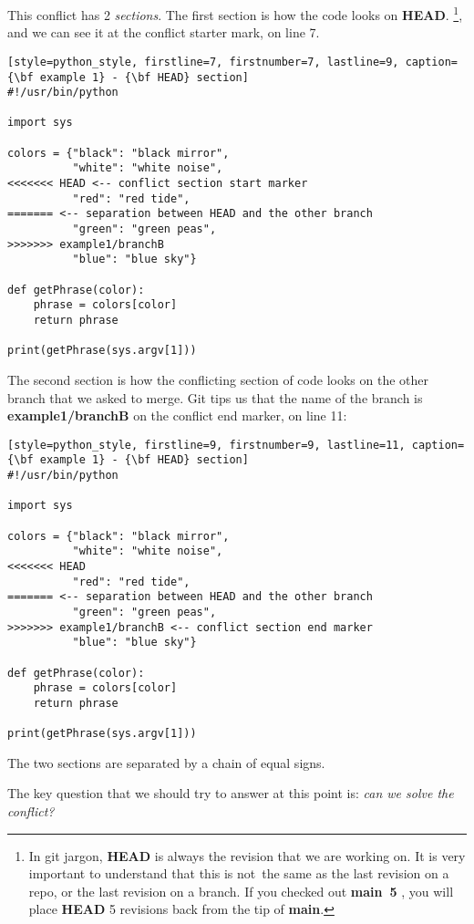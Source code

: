 This conflict has 2 {\it sections}. The first section is how the code looks on {\bf HEAD}.
\footnote{In git jargon, {\bf HEAD} is always the revision that we are working on. It is very important to understand
that this is not the same as the last revision on a repo, or the last revision on a branch. If you checked out {\bf main~5}
, you will place {\bf HEAD} 5 revisions back from the tip of {\bf main}.}, and we can see it at the conflict starter mark, on
line 7.

\begin{lstlisting}[style=python_style, firstline=7, firstnumber=7, lastline=9, caption={\bf example 1} - {\bf HEAD} section]
#!/usr/bin/python

import sys

colors = {"black": "black mirror",
          "white": "white noise",
<<<<<<< HEAD <-- conflict section start marker
          "red": "red tide",
======= <-- separation between HEAD and the other branch
          "green": "green peas",
>>>>>>> example1/branchB
          "blue": "blue sky"}

def getPhrase(color):
    phrase = colors[color]
    return phrase

print(getPhrase(sys.argv[1]))
\end{lstlisting}

The second section is how the conflicting section of code looks on the other branch that we asked to merge.
Git tips us that the name of the branch is {\bf example1/branchB} on the conflict end marker, on line 11:

\begin{lstlisting}[style=python_style, firstline=9, firstnumber=9, lastline=11, caption={\bf example 1} - {\bf HEAD} section]
#!/usr/bin/python

import sys

colors = {"black": "black mirror",
          "white": "white noise",
<<<<<<< HEAD
          "red": "red tide",
======= <-- separation between HEAD and the other branch
          "green": "green peas",
>>>>>>> example1/branchB <-- conflict section end marker
          "blue": "blue sky"}

def getPhrase(color):
    phrase = colors[color]
    return phrase

print(getPhrase(sys.argv[1]))
\end{lstlisting}

The two sections are separated by a chain of equal signs.

The key question that we should try to answer at this point is: {\it can we solve the conflict?}

